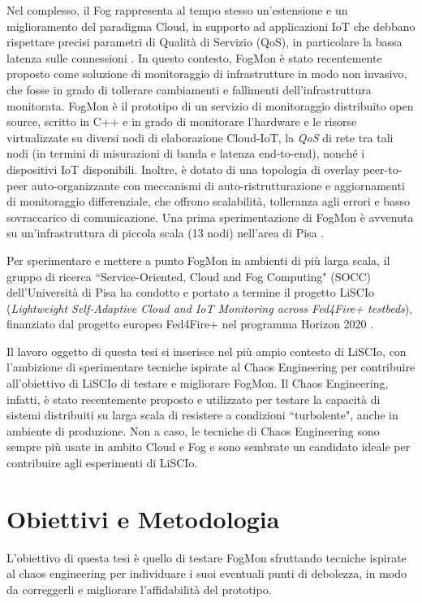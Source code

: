     Nel complesso, il Fog rappresenta al tempo stesso un'estensione e un miglioramento del paradigma Cloud, in supporto ad applicazioni IoT che debbano rispettare precisi parametri di Qualità di Servizio (QoS), in particolare la bassa latenza sulle connessioni \cite{brogi-forti}.
    In questo contesto, FogMon \cite{FogMon} è stato recentemente proposto come soluzione di monitoraggio di infrastrutture in modo non invasivo, che fosse in grado di tollerare cambiamenti e fallimenti dell'infrastruttura monitorata. FogMon è il prototipo di un servizio di monitoraggio distribuito open source, scritto in C++ e in grado di monitorare l'hardware e le risorse virtualizzate su diversi nodi di elaborazione Cloud-IoT, la \emph{QoS} di rete tra tali nodi (in termini di misurazioni di banda e latenza end-to-end), nonché i dispositivi IoT disponibili. Inoltre, è dotato di una topologia di overlay peer-to-peer auto-organizzante con meccanismi di auto-ristrutturazione e aggiornamenti di monitoraggio differenziale, che offrono scalabilità, tolleranza agli errori e basso sovraccarico di comunicazione. Una prima sperimentazione di FogMon è avvenuta su un'infrastruttura di piccola scala (13 nodi) nell'area di Pisa \cite{FogMon}.
    
    
    Per sperimentare e mettere a punto FogMon in ambienti di più larga scala, il gruppo di ricerca ``Service-Oriented, Cloud and Fog Computing" (SOCC) dell'Università di Pisa ha condotto e portato a termine il progetto LiSCIo (\textit{Lightweight Self-Adaptive Cloud and IoT Monitoring across Fed4Fire+ testbeds}), finanziato dal progetto europeo Fed4Fire+ nel programma Horizon 2020 \cite{Horizon}.
    
    Il lavoro oggetto di questa tesi si inserisce nel più ampio contesto di LiSCIo, con l'ambizione di sperimentare tecniche ispirate al Chaos Engineering \cite{gremlinchaos} per contribuire all'obiettivo di LiSCIo di testare e migliorare FogMon. Il Chaos Engineering, infatti, è stato recentemente proposto e utilizzato per testare la capacità di sistemi distribuiti su larga scala di resistere a condizioni ``turbolente", anche in ambiente di produzione. Non a caso, le tecniche di Chaos Engineering sono sempre più usate in ambito Cloud e Fog \cite {princofchaos} e sono sembrate un candidato ideale per contribuire agli esperimenti di LiSCIo.
    \section{Obiettivi e Metodologia}
    L'obiettivo di questa tesi è quello di testare FogMon sfruttando tecniche ispirate al chaos engineering per individuare i suoi eventuali punti di debolezza, in modo da correggerli e migliorare l'affidabilità del prototipo.
    
